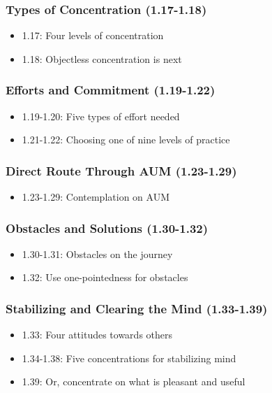 \begin{frame}[fragile]\frametitle{Types of Concentration (1.17-1.18)}
\begin{itemize}
\item 1.17: Four levels of concentration
\item 1.18: Objectless concentration is next
\end{itemize}
\end{frame}

\begin{frame}[fragile]\frametitle{Efforts and Commitment (1.19-1.22)}
\begin{itemize}
\item 1.19-1.20: Five types of effort needed
\item 1.21-1.22: Choosing one of nine levels of practice
\end{itemize}
\end{frame}

\begin{frame}[fragile]\frametitle{Direct Route Through AUM (1.23-1.29)}
\begin{itemize}
\item 1.23-1.29: Contemplation on AUM
\end{itemize}
\end{frame}

\begin{frame}[fragile]\frametitle{Obstacles and Solutions (1.30-1.32)}
\begin{itemize}
\item 1.30-1.31: Obstacles on the journey
\item 1.32: Use one-pointedness for obstacles
\end{itemize}
\end{frame}

\begin{frame}[fragile]\frametitle{Stabilizing and Clearing the Mind (1.33-1.39)}
\begin{itemize}
\item 1.33: Four attitudes towards others  
\item 1.34-1.38: Five concentrations for stabilizing mind
\item 1.39: Or, concentrate on what is pleasant and useful
\end{itemize}
\end{frame}

